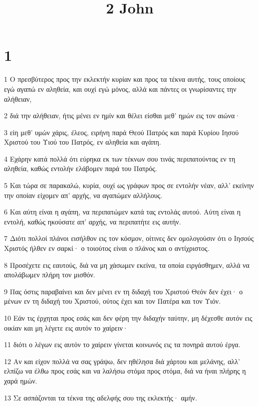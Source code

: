 

\title{2 John}


\chapter{1}

\par 1 Ο πρεσβύτερος προς την εκλεκτήν κυρίαν και προς τα τέκνα αυτής, τους οποίους εγώ αγαπώ εν αληθεία, και ουχί εγώ μόνος, αλλά και πάντες οι γνωρίσαντες την αλήθειαν,
\par 2 διά την αλήθειαν, ήτις μένει εν ημίν και θέλει είσθαι μεθ' ημών εις τον αιώνα·
\par 3 είη μεθ' υμών χάρις, έλεος, ειρήνη παρά Θεού Πατρός και παρά Κυρίου Ιησού Χριστού του Υιού του Πατρός, εν αληθεία και αγάπη.
\par 4 Εχάρην κατά πολλά ότι εύρηκα εκ των τέκνων σου τινάς περιπατούντας εν τη αληθεία, καθώς εντολήν ελάβομεν παρά του Πατρός.
\par 5 Και τώρα σε παρακαλώ, κυρία, ουχί ως γράφων προς σε εντολήν νέαν, αλλ' εκείνην την οποίαν είχομεν απ' αρχής, να αγαπώμεν αλλήλους.
\par 6 Και αύτη είναι η αγάπη, να περιπατώμεν κατά τας εντολάς αυτού. Αύτη είναι η εντολή, καθώς ηκούσατε απ' αρχής, να περιπατήτε εις αυτήν.
\par 7 Διότι πολλοί πλάνοι εισήλθον εις τον κόσμον, οίτινες δεν ομολογούσιν ότι ο Ιησούς Χριστός ήλθεν εν σαρκί· ο τοιούτος είναι ο πλάνος και ο αντίχριστος.
\par 8 Προσέχετε εις εαυτούς, διά να μη χάσωμεν εκείνα, τα οποία ειργάσθημεν, αλλά να απολάβωμεν πλήρη τον μισθόν.
\par 9 Πας όστις παραβαίνει και δεν μένει εν τη διδαχή του Χριστού Θεόν δεν έχει· ο μένων εν τη διδαχή του Χριστού, ούτος έχει και τον Πατέρα και τον Υιόν.
\par 10 Εάν τις έρχηται προς εσάς και δεν φέρη την διδαχήν ταύτην, μη δέχεσθε αυτόν εις οικίαν και μη λέγετε εις αυτόν το χαίρειν·
\par 11 διότι ο λέγων εις αυτόν το χαίρειν γίνεται κοινωνός εις τα πονηρά αυτού έργα.
\par 12 Αν και είχον πολλά να σας γράψω, δεν ηθέλησα διά χάρτου και μελάνης, αλλ' ελπίζω να έλθω προς εσάς και να λαλήσω στόμα προς στόμα, διά να ήναι πλήρης η χαρά ημών.
\par 13 Σε ασπάζονται τα τέκνα της αδελφής σου της εκλεκτής· αμήν.


